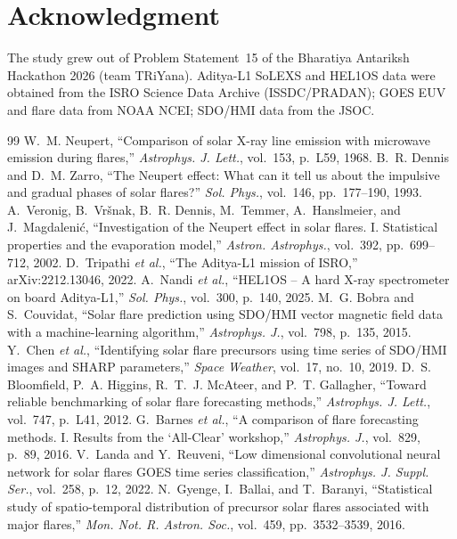 \documentclass[conference]{IEEEtran}
\begin{document}
\section*{Acknowledgment}
The study grew out of Problem Statement~15 of the Bharatiya Antariksh Hackathon 2026 (team TRiYana). Aditya-L1 SoLEXS and HEL1OS data were obtained from the ISRO Science Data Archive (ISSDC/PRADAN); GOES EUV and flare data from NOAA NCEI; SDO/HMI data from the JSOC.


\begin{thebibliography}{99}
 W.~M. Neupert, ``Comparison of solar X-ray line emission with microwave emission during flares,'' \emph{Astrophys. J. Lett.}, vol.~153, p.~L59, 1968.
 B.~R. Dennis and D.~M. Zarro, ``The Neupert effect: What can it tell us about the impulsive and gradual phases of solar flares?'' \emph{Sol. Phys.}, vol.~146, pp.~177--190, 1993.
 A.~Veronig, B.~Vr\v{s}nak, B.~R. Dennis, M.~Temmer, A.~Hanslmeier, and J.~Magdaleni\'c, ``Investigation of the Neupert effect in solar flares. I. Statistical properties and the evaporation model,'' \emph{Astron. Astrophys.}, vol.~392, pp.~699--712, 2002.
 D.~Tripathi \emph{et al.}, ``The Aditya-L1 mission of ISRO,'' arXiv:2212.13046, 2022.
 A.~Nandi \emph{et al.}, ``HEL1OS -- A hard X-ray spectrometer on board Aditya-L1,'' \emph{Sol. Phys.}, vol.~300, p.~140, 2025.
 M.~G. Bobra and S.~Couvidat, ``Solar flare prediction using SDO/HMI vector magnetic field data with a machine-learning algorithm,'' \emph{Astrophys. J.}, vol.~798, p.~135, 2015.
 Y.~Chen \emph{et al.}, ``Identifying solar flare precursors using time series of SDO/HMI images and SHARP parameters,'' \emph{Space Weather}, vol.~17, no.~10, 2019.
 D.~S. Bloomfield, P.~A. Higgins, R.~T.~J. McAteer, and P.~T. Gallagher, ``Toward reliable benchmarking of solar flare forecasting methods,'' \emph{Astrophys. J. Lett.}, vol.~747, p.~L41, 2012.
 G.~Barnes \emph{et al.}, ``A comparison of flare forecasting methods. I. Results from the `All-Clear' workshop,'' \emph{Astrophys. J.}, vol.~829, p.~89, 2016.
 V.~Landa and Y.~Reuveni, ``Low dimensional convolutional neural network for solar flares GOES time series classification,'' \emph{Astrophys. J. Suppl. Ser.}, vol.~258, p.~12, 2022.
 N.~Gyenge, I.~Ballai, and T.~Baranyi, ``Statistical study of spatio-temporal distribution of precursor solar flares associated with major flares,'' \emph{Mon. Not. R. Astron. Soc.}, vol.~459, pp.~3532--3539, 2016.

\end{thebibliography}
\end{document}
